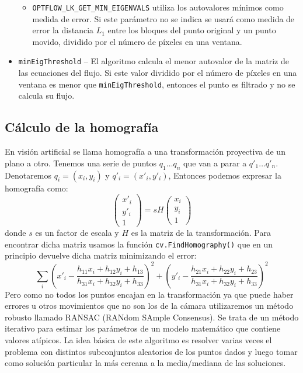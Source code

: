 \documentclass[a4paper,openright, 12pt]{book}
\begin{document}
\begin{itemize}
\begin{itemize}
    \item \lstinline|OPTFLOW_LK_GET_MIN_EIGENVALS| utiliza los autovalores mínimos como medida de error. Si este parámetro no se indica se usará como medida de error la distancia $L_1$ entre los bloques del punto original y un punto movido, dividido por el número de píxeles en una ventana.
	\end{itemize}
\item \lstinline|minEigThreshold| –  El algoritmo calcula el menor autovalor de la matriz de las ecuaciones del flujo. Si este valor dividido por el número de píxeles en una ventana es menor que \lstinline|minEigThreshold|, entonces el punto es filtrado y no se calcula su flujo.

\end{itemize}
\newpage

\subsection{Cálculo de la homografía}
En visión artificial se llama homografía a una transformación proyectiva de un plano a otro.
\newline
Tenemos una serie de puntos $q_1 \ldots q_n$ que van a parar a $q'_1 \ldots q'_n$. Denotaremos $q_i = (x_i,y_i)$ y $q'_i=(x'_i, y'_i)$,
Entonces podemos expresar la homografía como:
\begin{equation}
	\left( \begin{array}{c}
	x'_i\\
	y'_i\\
	1
	\end{array} \right)
	= sH
		\left( \begin{array}{c}
	x_i\\
	y_i\\
	1
	\end{array} \right)
\end{equation}
donde $s$ es un factor de escala y $H$ es la matriz de la transformación.
Para encontrar dicha matriz usamos la función \lstinline|cv.FindHomography()|
que en un principio devuelve dicha matriz minimizando el error:
\begin{equation*}
\sum_i \left( x'_i - \dfrac{h_{11}x_i + h_{12}y_i + h_{13}}{h_{31}x_i + h_{32}y_i + h_{33}} \right) ^2  
+ 
\left( y'_i - \dfrac{h_{21}x_i + h_{22}y_i + h_{23}}{h_{31}x_i + h_{32}y_i + h_{33}} \right) ^2 
\end{equation*}
Pero como no todos los puntos encajan en la transformación ya que puede haber errores u otros movimientos que no son los de la cámara utilizaremos un método robusto llamado RANSAC (RANdom SAmple Consensus). Se trata de un método iterativo para estimar los parámetros de un modelo matemático que contiene valores atípicos. La idea básica de este algoritmo es resolver varias veces el problema con distintos subconjuntos aleatorios de los puntos dados y luego tomar como solución particular la más cercana a la media/mediana de las soluciones.
\newpage
\end{document}
